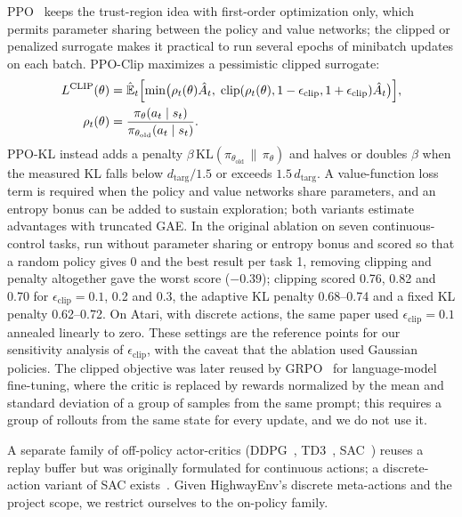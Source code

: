 PPO~\cite{schulman2017ppo} keeps the trust-region idea with first-order optimization only, which permits parameter
sharing between the policy and value networks; the clipped or penalized surrogate makes it practical to run several
epochs of minibatch updates on each batch. PPO-Clip maximizes a pessimistic clipped surrogate:
\begin{equation}
  \begin{aligned}
  L^{\mathrm{CLIP}}(\theta) &= \hat{\mathbb{E}}_t\Bigl[\min\bigl(\rho_t(\theta)\hat{A}_t,\;
  \mathrm{clip}(\rho_t(\theta), 1-\epsilon_{\mathrm{clip}}, 1+\epsilon_{\mathrm{clip}})\hat{A}_t\bigr)\Bigr],\\
  \rho_t(\theta) &= \frac{\pi_\theta(a_t \mid s_t)}{\pi_{\theta_{\mathrm{old}}}(a_t \mid s_t)}.
  \end{aligned}
  \label{eq:ppo-clip}
\end{equation}
PPO-KL instead adds a penalty $\beta\,\mathrm{KL}(\pi_{\theta_{\mathrm{old}}} \,\|\, \pi_\theta)$ and halves or doubles
$\beta$ when the measured KL falls below $d_{\mathrm{targ}}/1.5$ or exceeds $1.5\,d_{\mathrm{targ}}$. A value-function
loss term is required when the policy and value networks share parameters, and an entropy bonus can be added to
sustain exploration; both variants estimate advantages with truncated GAE. In the original ablation on seven
continuous-control tasks, run without parameter sharing or entropy bonus and scored so that a random policy gives 0
and the best result per task 1, removing clipping and penalty altogether gave the worst score ($-0.39$); clipping
scored 0.76, 0.82 and 0.70 for $\epsilon_{\mathrm{clip}} = 0.1$, 0.2 and 0.3, the adaptive KL penalty 0.68--0.74 and a
fixed KL penalty 0.62--0.72. On Atari, with discrete actions, the same paper used $\epsilon_{\mathrm{clip}} = 0.1$
annealed linearly to zero. These settings are the reference points for our sensitivity analysis of
$\epsilon_{\mathrm{clip}}$, with the caveat that the ablation used Gaussian policies. The clipped objective was later
reused by GRPO~\cite{shao2024deepseekmath} for language-model fine-tuning, where the critic is replaced by rewards
normalized by the mean and standard deviation of a group of samples from the same prompt; this requires a group of
rollouts from the same state for every update, and we do not use it.

A separate family of off-policy actor-critics (DDPG~\cite{lillicrap2016ddpg}, TD3~\cite{fujimoto2018td3},
SAC~\cite{haarnoja2018sac}) reuses a replay buffer but was originally formulated for continuous actions; a
discrete-action variant of SAC exists~\cite{christodoulou2019sacdiscrete}. Given HighwayEnv's discrete meta-actions
and the project scope, we restrict ourselves to the on-policy family.

